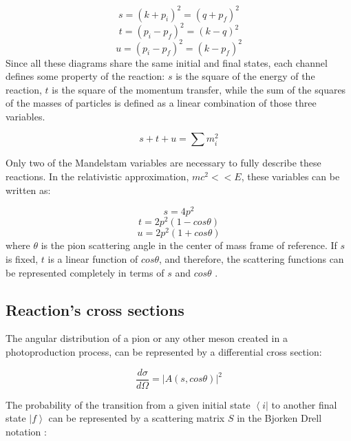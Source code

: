 \begin{equation}
s=(k+p_{i})^{2}=(q+p_{f})^{2}
\end{equation}
\begin{equation}
t=(p_{i}-p_{f})^{2}=(k-q)^{2}
\end{equation}
\begin{equation}
u=(p_{i}-p_{f})^{2}=(k-p_{f})^{2}
\end{equation}
Since all these diagrams share the same initial and final states, each channel defines some property of the reaction: $s$ is the square of the energy of the reaction, $t$ is the square of the momentum transfer, while the sum of the squares of the masses of particles is defined as a linear combination of those three variables.

\begin{equation}
s+t+u=\sum m^{2}_{i}
\end{equation}

\indent Only two of the Mandelstam variables are necessary to fully describe these reactions. In the relativistic approximation, $mc^{2}<<E$, these variables can be written as:

\begin{equation}
s=4p^{2}
\end{equation}
\begin{equation}
t=2p^{2}(1-cos\theta)
\end{equation}
\begin{equation}
u=2p^{2}(1+cos\theta)
\end{equation}
where $\theta$ is the pion scattering angle in the center of mass frame of reference. If $s$ is fixed, $t$ is a linear function of $cos\theta$, and therefore, the scattering functions can be represented completely in terms of $s$ and $cos\theta$ \cite{bertulani}.

\subsection{Reaction's cross sections}

\indent The angular distribution of a pion or any other meson created in a photoproduction process, can be represented by a differential cross section:

\begin{equation}
\frac{d\sigma}{d\Omega}=|A(s,cos\theta)|^{2}
\end{equation}

\indent The probability of the transition from a given initial state $\left<i\right|$ to another final state $\left|f\right>$ can be represented by a scattering matrix $S$ in the Bjorken Drell notation \cite{bjorken}:

